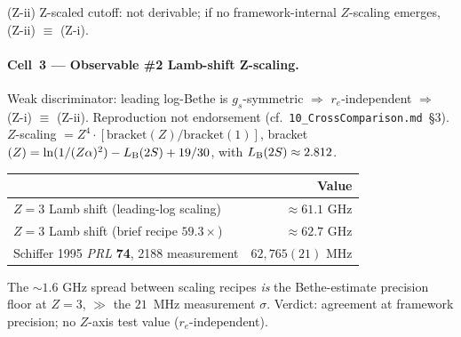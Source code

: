 (Z-ii) Z-scaled cutoff: not derivable; if no framework-internal $Z$-scaling
emerges, (Z-ii) $\equiv$ (Z-i).

\paragraph{Cell~3 --- Observable \#2 Lamb-shift Z-scaling.}
Weak discriminator: leading log-Bethe is $g_s$-symmetric $\Rightarrow$
$r_e$-independent $\Rightarrow$ (Z-i) $\equiv$ (Z-ii). Reproduction not
endorsement (cf.~\texttt{10\_CrossComparison.md}~\S3). $Z$-scaling
$= Z^4 \cdot [\text{bracket}(Z)/\text{bracket}(1)]$, bracket$(Z) = \ln(1/(Z\alpha)^2) - L_{\rm B}(2S) + 19/30$, with $L_{\rm B}(2S) \approx 2.812$.

\wolframcheck{}
\begin{center}
\begin{tabular}{lr}
\toprule
                                              & Value \\
\midrule
$Z=3$ Lamb shift (leading-log scaling)        & $\approx 61.1$ GHz \\
$Z=3$ Lamb shift (brief recipe $59.3\times$)  & $\approx 62.7$ GHz \\
Schiffer 1995 \emph{PRL} \textbf{74}, 2188 measurement & $62{,}765(21)$ MHz \\
\bottomrule
\end{tabular}
\end{center}
The $\sim\!1.6$ GHz spread between scaling recipes \emph{is} the Bethe-estimate
precision floor at $Z=3$, $\gg$ the $21$~MHz measurement $\sigma$. Verdict:
agreement at framework precision; no $Z$-axis test value ($r_e$-independent).


